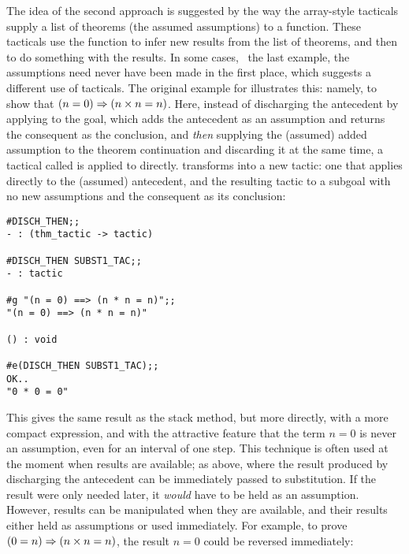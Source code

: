The idea of the second approach is suggested by the way the array-style
tacticals supply a list of theorems (the assumed assumptions)
to a function.  These tacticals use the function to
infer new
results from the list of theorems, and then to do something with the
results. In some cases,
\eg\ the last example, the assumptions need never have been made in the
first place, which suggests a different use of tacticals.
The original example for 
illustrates this: namely, to show that $(n = 0) \Rightarrow (n\times n = n)$.  Here,
instead of discharging the antecedent by applying
 to the goal, which adds the antecedent as an assumption
and returns the consequent as the conclusion,
and {\it then\/} supplying the (assumed) added assumption to the
theorem continuation  and
discarding it at the same time,
a tactical called  is applied to  directly.
 transforms  into
a new tactic: one that applies  directly to the (assumed)
antecedent, and the resulting tactic to a subgoal with no new
assumptions and the consequent as its conclusion:
\vfill
\newpage

\setcounter{sessioncount}{1}
\begin{session}\begin{verbatim}
#DISCH_THEN;;
- : (thm_tactic -> tactic)

#DISCH_THEN SUBST1_TAC;;
- : tactic

#g "(n = 0) ==> (n * n = n)";;
"(n = 0) ==> (n * n = n)"

() : void

#e(DISCH_THEN SUBST1_TAC);;
OK..
"0 * 0 = 0"
\end{verbatim}\end{session}

\noindent This gives the same result as the stack method, but more
directly, with a more compact \ML{} expression,
and with the attractive feature that the term
$n=0$ is never an assumption, even for an interval of one step.
This technique is often used at the moment when results are available;
as above, where the result produced by discharging the antecedent can be
immediately passed to substitution. If the result were only needed
later, it {\it would\/} have to be held as an assumption. However, results
can be manipulated when they are available, and their results
either held as assumptions or used immediately.
For example, to prove $(0=n) \Rightarrow (n \times n = n)$,
the result $n=0$ could be reversed
immediately:

